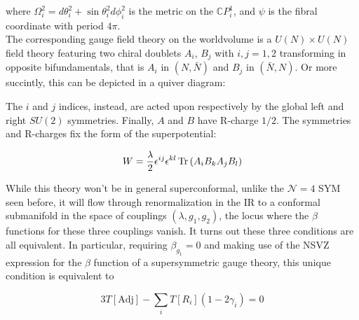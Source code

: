 where $\Omega_i^2 = d\theta_i^2 + \sin\theta_i^2 d\phi_i^2$ is the metric on the $\mathbb{C}P^1_i$, and $\psi$ is the fibral coordinate with period $4\pi$.\\

The corresponding gauge field theory on the worldvolume is a $U(N)\times U(N)$ field theory featuring two chiral doublets $A_i$, $B_j$ with $i,j = 1,2$ transforming in opposite bifundamentals, that is $A_i$ in $(N,\bar N)$ and $B_j$ in $(\bar N, N)$. Or more succintly, this can be depicted in a quiver diagram:

\begin{figure}[!h]
	\centering
{}
\end{figure}


The $i$ and $j$ indices, instead, are acted upon respectively by the global left and right $SU(2)$ symmetries. Finally, $A$ and $B$ have R-charge $1/2$. The symmetries and R-charges fix the form of the superpotential:

\begin{equation}
	W = \frac{\lambda}{2} \epsilon^{ij} \epsilon^{kl} \operatorname{Tr} \left( A_i B_k A_j B_l \right)
	\label{}
\end{equation}

While this theory won't be in general superconformal, unlike the $\mathcal{N}=4$ SYM seen before, it will flow through renormalization in the IR to a conformal submanifold in the space of couplings $(\lambda,g_1,g_2)$, the locus where the $\beta$ functions for these three couplings vanish. It turns out these three conditions are all equivalent. In particular, requiring $\beta_{g_1} = 0$ and making use of the NSVZ expression for the $\beta$ function of a supersymmetric gauge theory, this unique condition is equivalent to


\begin{equation}
	3 T[\mathrm{Adj}] - \sum_i T[R_i] ( 1- 2\gamma_i) = 0
	\label{}
\end{equation}

